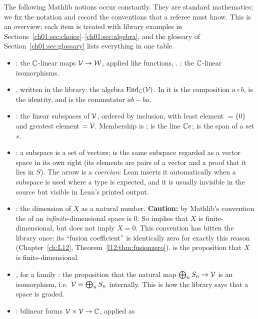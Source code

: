 The following Mathlib notions occur constantly. They are standard mathematics; we fix the notation
and record the conventions that a referee must know. This is an overview; each item is treated with
library examples in Sections~\ref{ch01:sec:choice}--\ref{ch01:sec:algebra}, and the glossary of
Section~\ref{ch01:sec:glossary} lists everything in one table.
\begin{itemize}
\item {}: the ${\mathbb{C}}$-linear maps $\mathcal{V}\to\mathcal W$, applied like functions,
  . : the ${\mathbb{C}}$-linear isomorphisms.
\item {}, written  in the library: the algebra $\operatorname{End}_{\mathbb{C}}(\mathcal{V})$.
  In it  is the composition $a\circ b$,  is the identity, and  is
  the commutator $ab-ba$.
\item {}: the linear subspaces of $\mathcal{V}$, ordered by inclusion, with least
  element  $=\{0\}$ and greatest element  $=\mathcal{V}$. Membership is ;
   is the line ${\mathbb{C}} v$;  is the span of a set $s$.
\item {}: a subspace  is a set of vectors;  is the same
  subspace regarded as a vector space in its own right (its elements are pairs of a vector and a
  proof that it lies in $S$). The arrow is a \emph{coercion}: Lean inserts it automatically when a
  subspace is used where a type is expected, and it is usually invisible in the source but visible
  in Lean's printed output.
\item {}: the dimension of $X$ as a natural number. \textbf{Caution:} by
  Mathlib's convention the  of an \emph{infinite}-dimensional space is $0$. So
   implies that $X$ is finite-dimensional, but 
  does not imply $X = 0$. This convention has bitten the library once: its ``fusion coefficient'' is
  identically zero for exactly this reason (Chapter~\ref{ch:L12}, Theorem~\ref{l12:thm:fusionzero}).
   is the proposition that $X$ is finite-dimensional.
\item {}, for a family : the proposition
  that the natural map $\bigoplus_n S_n\to\mathcal{V}$ is an isomorphism, i.e.\
  $\mathcal{V} = \bigoplus_n S_n$ internally. This is how the library says that a space is graded.
\item \lean{LinearMap.BilinForm ℂ 𝒱}: bilinear forms $\mathcal{V}\times\mathcal{V}\to{\mathbb{C}}$, applied as

\end{itemize}
